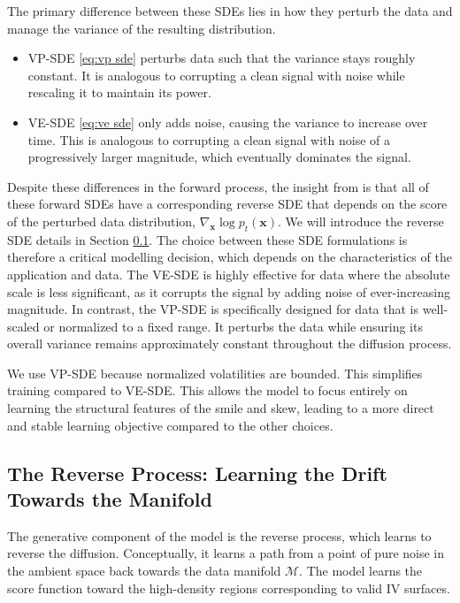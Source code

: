 \documentclass{article}
\begin{document}
The primary difference between these SDEs lies in how they perturb the data and manage the variance of the resulting distribution.
\begin{itemize}
    \item VP-SDE \eqref{eq:vp sde} perturbs data such that the variance stays roughly constant. It is analogous to corrupting a clean signal with noise while rescaling it to maintain its power.
    \item VE-SDE \eqref{eq:ve sde} only adds noise, causing the variance to increase over time. This is analogous to corrupting a clean signal with noise of a progressively larger magnitude, which eventually dominates the signal.
\end{itemize}
Despite these differences in the forward process, the insight from \citet{DBLP:journals/corr/abs-2011-13456} is that all of these forward SDEs have a corresponding reverse SDE that depends on the score of the perturbed data distribution, $\nabla_{\mathbf{x}} \log p_t(\mathbf{x})$. We will introduce the reverse SDE details in Section \ref{subsec: reverse_SDE}. The choice between these SDE formulations is therefore a critical modelling decision, which depends on the characteristics of the application and data.
The VE-SDE is highly effective for data where the absolute scale is less significant, as it corrupts the signal by adding noise of ever-increasing magnitude. In contrast, the VP-SDE is specifically designed for data that is well-scaled or normalized to a fixed range. It perturbs the data while ensuring its overall variance remains approximately constant throughout the diffusion process.

We use VP-SDE because normalized volatilities are bounded. This simplifies training compared to VE-SDE. This allows the model to focus entirely on learning the structural features of the smile and skew, leading to a more direct and stable learning objective compared to the other choices.

\subsection{The Reverse Process: Learning the Drift Towards the Manifold}
\label{subsec: reverse_SDE}
The generative component of the model is the reverse process, which learns to reverse the diffusion. Conceptually, it learns a path from a point of pure noise in the ambient space back towards the data manifold $\mathcal{M}$. The model learns the score function toward the high-density regions corresponding to valid IV surfaces.
\end{document}

